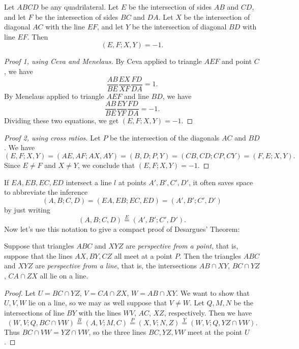 \begin{thm} Let $ABCD$ be any quadrilateral. Let $E$ be the intersection of sides $AB$ and $CD$, and let $F$ be the intersection of sides $BC$ and $DA$. Let $X$ be the intersection of diagonal $AC$ with the line $EF$, and let $Y$ be the intersection of diagonal $BD$ with line $EF$. Then
\[
(E,F;X,Y) = -1.
\]
\end{thm}
\begin{proof}[Proof 1, using Ceva and Menelaus] By Ceva applied to triangle $AEF$ and point $C$, we have
\[
\frac{AB}{BE}\frac{EX}{XF}\frac{FD}{DA} = 1.
\]
By Menelaus applied to triangle $AEF$ and line $BD$, we have
\[
\frac{AB}{BE}\frac{EY}{YF}\frac{FD}{DA} = -1.
\]
Dividing these two equations, we get $(E,F;X,Y) = -1$.
\end{proof}
\begin{proof}[Proof 2, using cross ratios] Let $P$ be the intersection of the diagonals $AC$ and $BD$. We have
\[
(E,F;X,Y) = (AE,AF;AX,AY) = (B,D;P,Y) = (CB,CD;CP,CY) = (F,E;X,Y).
\]
Since $E\ne F$ and $X\ne Y$, we conclude that $(E,F;X,Y) = -1$.
\end{proof}

If $EA,EB,EC,ED$ intersect a line $l$ at points $A',B',C',D'$, it often saves space to abbreviate the inference
\[
(A,B;C,D) = (EA,EB;EC,ED) = (A',B';C',D')
\]
by just writing
\[
(A,B;C,D) \stackrel{E}{=} (A',B';C',D').
\]
Now let's use this notation to give a compact proof of Desargues' Theorem:

\begin{thm}\label{desargues} Suppose that triangles $ABC$ and $XYZ$ are \emph{perspective from a point}, that is, suppose that the lines $AX,BY,CZ$ all meet at a point $P$. Then the triangles $ABC$ and $XYZ$ are \emph{perspective from a line}, that is, the intersections $AB\cap XY$, $BC\cap YZ$, $CA\cap ZX$ all lie on a line.
\end{thm}
\begin{proof}
Let $U = BC\cap YZ$, $V = CA\cap ZX$, $W = AB\cap XY$. We want to show that $U,V,W$ lie on a line, so we may as well suppose that $V\ne W$. Let $Q,M,N$ be the intersections of line $BY$ with the lines $WV$, $AC$, $XZ$, respectively. Then we have
\[
(W,V;Q,BC\cap VW) \stackrel{B}{=} (A,V;M,C) \stackrel{P}{=} (X,V;N,Z) \stackrel{Y}{=} (W,V;Q,YZ\cap VW).
\]
Thus $BC\cap VW = YZ\cap VW$, so the three lines $BC,YZ,VW$ meet at the point $U$.
\end{proof}

